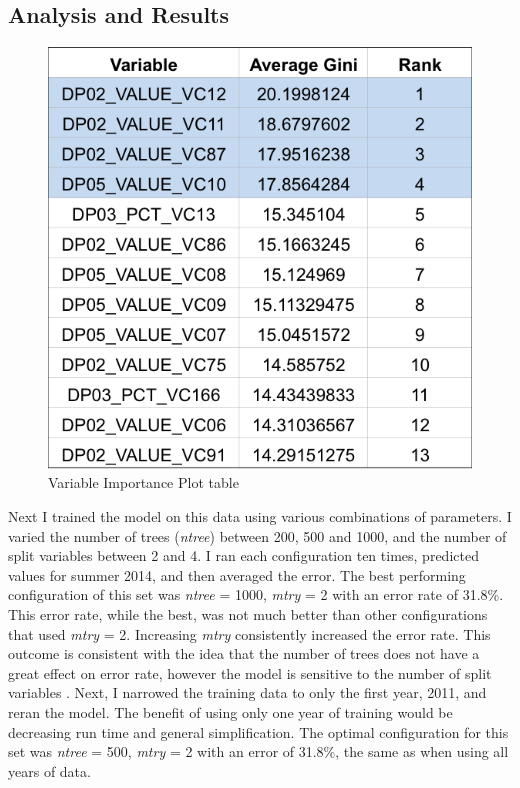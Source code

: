\documentclass [a4paper,12 pt]{article}
\begin{document}
\subsection{Analysis and Results}

\begin{figure}
\begin{center}
\vspace{-200pt}
\centering
	\includegraphics[viewport=-20 0 550 547,clip,scale=0.7]{Figures/varImpPlotTable.png}
\caption{Variable Importance Plot table}\label{impPlotTable}	
		
\end{center}
\end{figure}

Next I trained the model on this data using various combinations of parameters. I varied the number of trees (\emph{ntree}) between 200, 500 and 1000, and the number of split variables between 2 and 4. I ran each configuration ten times, predicted values for summer 2014, and then averaged the error. The best performing configuration of this set was \emph{ntree} = 1000, \emph{mtry} = 2 with an error rate of 31.8\%. This error rate, while the best, was not much better than other configurations that used \emph{mtry} = 2. Increasing \emph{mtry} consistently increased the error rate. This outcome is consistent with the idea that the number of trees does not have a great effect on error rate, however the model is sensitive to the number of split variables \citep{breiman2001random}. Next, I narrowed the training data to only the first year, 2011, and reran the model. The benefit of using only one year of training would be decreasing run time and general simplification. The optimal configuration for this set was \emph{ntree} = 500, \emph{mtry} = 2 with an error of 31.8\%, the same as when using all years of data.
\end{document}
